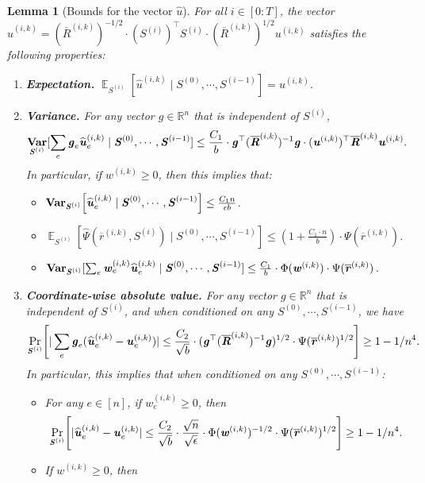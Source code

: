 \documentclass[11pt]{article}
\newtheorem{lemma}[theorem]{Lemma}
\let\originalleft\left
\let\originalright\right
\renewcommand{\left}{\mathopen{}\mathclose\bgroup\originalleft}
\renewcommand{\right}{\aftergroup\egroup\originalright}
\renewcommand\gg{\boldsymbol{\mathit{g}}}
\newcommand\uu{\boldsymbol{\mathit{u}}}
\newcommand\ww{\boldsymbol{\mathit{w}}}
\newcommand\rrbar{\overline{\boldsymbol{\mathit{r}}}}
\renewcommand\SS{\boldsymbol{\mathit{S}}}
\newcommand\RRbar{\boldsymbol{\overline{\mathit{R}}}}
\newcommand{\wh}{\widehat}
\newcommand\R{\mathbb{R}}
\DeclareMathOperator*{\E}{{\mathbb{E}}}
\DeclareMathOperator*{\Var}{{\bf {Var}}}
\begin{document}
\begin{lemma}[Bounds for the vector $\wh{\uu}$]\label{lem:hat_u_bounds} 
For all $i \in [0:T]$, the vector $\wh{\uu}^{(i,k)} = (\RRbar^{(i,k)})^{-1/2} \cdot (\SS^{(i)})^{\top} \SS^{(i)} \cdot (\RRbar^{(i,k)})^{1/2} \uu^{(i,k)}$ satisfies the following properties:
\begin{enumerate}
\item {\bf Expectation.} $\E_{\SS^{(i)}}[\wh{\uu}^{(i,k)} \mid \SS^{(0)}, \cdots, \SS^{(i-1)}] = \uu^{(i,k)}$.
\item {\bf Variance.} For any vector $\gg \in \R^n$ that is independent of $\SS^{(i)}$, 
\[
\Var_{\SS^{(i)}}[\sum_e \gg_e \wh{\uu}^{(i,k)}_e \mid \SS^{(0)}, \cdots, \SS^{(i-1)}] \leq \frac{C_1}{b} \cdot \gg^{\top} (\RRbar^{(i,k)})^{-1} \gg \cdot (\uu^{(i,k)})^{\top} \RRbar^{(i,k)} \uu^{(i,k)}.
\]
In particular, if $\ww^{(i,k)} \geq 0$, then this implies that:
\begin{itemize}
\item $\Var_{\SS^{(i)}}\left[\wh{\uu}^{(i,k)}_e \mid \SS^{(0)}, \cdots, \SS^{(i-1)} \right] \leq \frac{C_1 n}{\epsilon b}$.
\item $\E_{\SS^{(i)}}[\wh{\Psi}(\rrbar^{(i,k)}, \SS^{(i)}) \mid \SS^{(0)}, \cdots, \SS^{(i-1)}] \leq (1 + \frac{C_1 \cdot n}{b}) \cdot \Psi(\rrbar^{(i,k)})$.
\item $\Var_{\SS^{(i)}}[\sum_e \ww^{(i,k)}_e \wh{\uu}^{(i,k)}_e \mid \SS^{(0)}, \cdots, \SS^{(i-1)}] \leq \frac{C_1}{b} \cdot \Phi(\ww^{(i,k)}) \cdot \Psi(\rrbar^{(i,k)})$.
\end{itemize}
\item {\bf Coordinate-wise absolute value.} For any vector $\gg \in \R^n$ that is independent of $\SS^{(i)}$, and when conditioned on any $\SS^{(0)}, \cdots, \SS^{(i-1)}$, we have
\[
\Pr_{\SS^{(i)}}\left[|\sum_e \gg_e (\wh{\uu}^{(i,k)}_e - \uu^{(i,k)}_e)| \leq \frac{C_2}{\sqrt{b}} \cdot (\gg^{\top} (\RRbar^{(i,k)})^{-1} \gg)^{1/2} \cdot \Psi(\rrbar^{(i,k)})^{1/2} \right] \geq 1 - 1/n^4.
\]
In particular, this implies that when conditioned on any $\SS^{(0)}, \cdots, \SS^{(i-1)}$:
\begin{itemize}
\item For any $e \in [n]$, if $\ww_e^{(i,k)} \geq 0$, then
\[
\Pr_{\SS^{(i)}}\left[|\wh{\uu}^{(i,k)}_e - \uu^{(i,k)}_e| \leq \frac{C_2}{\sqrt{b}} \cdot \frac{\sqrt{n}}{\sqrt{\epsilon}} \cdot \Phi(\ww^{(i,k)})^{-1/2} \cdot \Psi(\rrbar^{(i,k)})^{1/2} \right] \geq 1 - 1/n^4.
\]
\item If $\ww^{(i,k)} \geq 0$, then 
\begin{align*}

\end{align*}
\end{itemize}
\end{enumerate}
\end{lemma}
\end{document}
